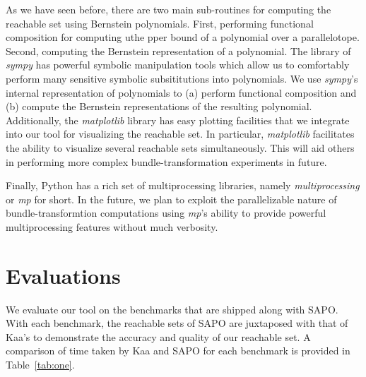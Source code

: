 \documentclass[EPiC]{easychair}
\begin{document}
%
As we have seen before, there are two main sub-routines for computing the reachable set using Bernstein polynomials.
%
First, performing functional composition for computing uthe pper bound of a polynomial over a parallelotope.
%
Second, computing the Bernstein representation of a polynomial.
%
The library of \emph{sympy} has powerful symbolic manipulation tools which allow us to comfortably perform many sensitive symbolic subsititutions into polynomials. 
%
We use \emph{sympy}'s internal representation of polynomials to (a) perform functional composition and (b) compute the Bernstein representations of the resulting polynomial.
%
Additionally, the \emph{matplotlib} library has easy plotting facilities that we integrate into our tool for visualizing the reachable set. In particular, \emph{matplotlib} facilitates the ability to visualize several reachable sets simultaneously. This will aid others in performing more complex bundle-transformation experiments in future. 

%
Finally, Python has a rich set of multiprocessing libraries, namely \emph{multiprocessing} or \emph{mp} for short. In the future, we plan to exploit the parallelizable nature of bundle-transformtion computations using \emph{mp}'s ability to provide powerful multiprocessing features without much verbosity.






\section{Evaluations}
We evaluate our tool on the benchmarks that are shipped along with SAPO. With each benchmark, the reachable sets of SAPO are juxtaposed with that of Kaa's to demonstrate the accuracy and quality of our reachable set. A comparison of time taken by Kaa and SAPO for each benchmark is provided in Table~\ref{tab:one}.
\end{document}

